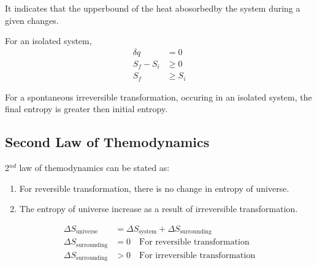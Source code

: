 \documentclass[fleqn,10pt]{SelfArx} %
\begin{document}
It indicates that the upperbound of the heat abosorbedby the system during a given changes.

For an isolated system,
\begin{align}
    \delta q &= 0 \\
    S_f - S_i &\geq 0 \\ 
    S_f &\geq S_i 
\end{align}

For a spontaneous irreversible transformation, occuring in an isolated system, the final entropy is greater then initial entropy. 

\subsection{Second Law of Themodynamics}
2$^{nd}$ law of themodynamics can be stated as:
\begin{enumerate}
    \item For reversible transformation, there is no change in entropy of universe.
    \item The entropy of universe increase as a result of irreversible transformation.
\end{enumerate}

\begin{align*}
    \Delta S_{\text{universe}} &= \Delta S_{\text{system}} +\Delta S_{\text{surrounding}} \\
    \Delta S_{\text{surrounding}} &= 0 \quad \text{For reversible transformation} \\
    \Delta S_{\text{surrounding}} &> 0 \quad \text{For irreversible transformation}
\end{align*}
\end{document}
